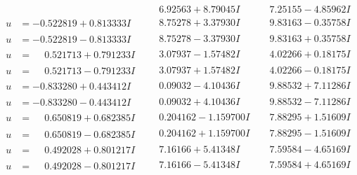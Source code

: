 \documentclass[1p]{elsarticle_modified}
\theoremstyle{definition}
\begin{document}
$$\begin{array}{c|c|c}
 & \phantom{-}6.92563 + 8.79045 I & \phantom{-}7.25155 - 4.85962 I \\ \hline\begin{aligned}
u &= -0.522819 + 0.813333 I\end{aligned}
 & \phantom{-}8.75278 + 3.37930 I & \phantom{-}9.83163 - 0.35758 I \\ \hline\begin{aligned}
u &= -0.522819 - 0.813333 I\end{aligned}
 & \phantom{-}8.75278 - 3.37930 I & \phantom{-}9.83163 + 0.35758 I \\ \hline\begin{aligned}
u &= \phantom{-}0.521713 + 0.791233 I\end{aligned}
 & \phantom{-}3.07937 - 1.57482 I & \phantom{-}4.02266 + 0.18175 I \\ \hline\begin{aligned}
u &= \phantom{-}0.521713 - 0.791233 I\end{aligned}
 & \phantom{-}3.07937 + 1.57482 I & \phantom{-}4.02266 - 0.18175 I \\ \hline\begin{aligned}
u &= -0.833280 + 0.443412 I\end{aligned}
 & \phantom{-}0.09032 - 4.10436 I & \phantom{-}9.88532 + 7.11286 I \\ \hline\begin{aligned}
u &= -0.833280 - 0.443412 I\end{aligned}
 & \phantom{-}0.09032 + 4.10436 I & \phantom{-}9.88532 - 7.11286 I \\ \hline\begin{aligned}
u &= \phantom{-}0.650819 + 0.682385 I\end{aligned}
 & \phantom{-}0.204162 - 1.159700 I & \phantom{-}7.88295 + 1.51609 I \\ \hline\begin{aligned}
u &= \phantom{-}0.650819 - 0.682385 I\end{aligned}
 & \phantom{-}0.204162 + 1.159700 I & \phantom{-}7.88295 - 1.51609 I \\ \hline\begin{aligned}
u &= \phantom{-}0.492028 + 0.801217 I\end{aligned}
 & \phantom{-}7.16166 + 5.41348 I & \phantom{-}7.59584 - 4.65169 I \\ \hline\begin{aligned}
u &= \phantom{-}0.492028 - 0.801217 I\end{aligned}
 & \phantom{-}7.16166 - 5.41348 I & \phantom{-}7.59584 + 4.65169 I \\ \hline\begin{aligned}

\end{aligned}
\end{array}$$
\end{document}
